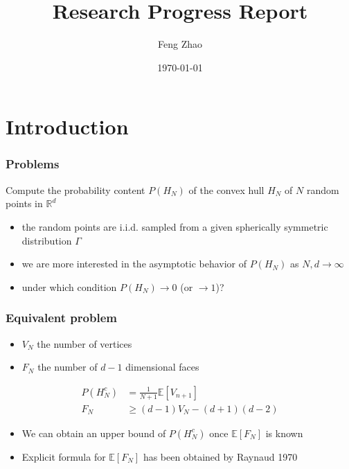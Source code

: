 \documentclass{beamer}
\title{Research Progress Report}
\author{Feng Zhao}
\date{\today}
\begin{document}
\begin{frame}
	\titlepage
\end{frame}


\section{Introduction}

\begin{frame}
\frametitle{Problems}
Compute the probability content $P(H_N)$ of the convex hull $H_N$
of $N$ random points in $\mathbb{R}^d$
\begin{itemize}
\item the random points are i.i.d. sampled from a given spherically symmetric distribution $\Gamma$
\item we are more interested in the asymptotic behavior of $P(H_N)$
as $N,d\to\infty$
\item under which condition $P(H_N) \to 0$ (or $\to 1$)?
\end{itemize}
\end{frame}
\begin{frame}
	\frametitle{Equivalent problem}
    \begin{itemize}
        \item $V_N$ the number of vertices
        \item $F_N$ the number of $d-1$ dimensional faces
    \end{itemize}
    \begin{align}
        P(H_N^c) & = \frac{1}{N+1}\mathbb{E}[V_{n+1}]\\
        F_N &\geq (d-1) V_N - (d+1)(d-2)
        \label{eq:FV_d}
    \end{align}   
    \begin{itemize}
    \item We can obtain an upper bound of $P(H_N^c)$ once
    $\mathbb{E}[F_{N}]$ is known
    \item Explicit formula for $\mathbb{E}[F_{N}]$
    has been obtained by Raynaud 1970
    \end{itemize}
\end{frame}   


\end{document}
